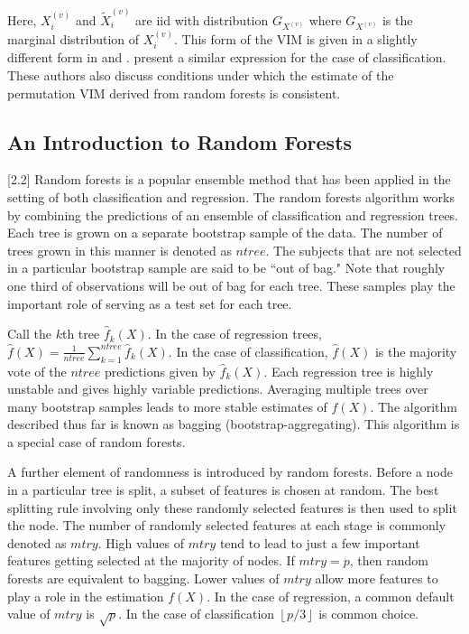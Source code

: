 \documentclass[article,shortnames]{jss}
\begin{document}
Here, $X^{(v)}_{i}$ and $\tilde{X}^{(v)}_{i}$ are iid with distribution $G_{X^{(v)}}$ where $G_{X^{(v)}}$ is the marginal distribution of $X^{(v)}_{i}$.  This form of the VIM is given in a slightly different form in \cite{gregorutti2013correlation} and \cite{zhu2012reinforcement}.
\cite{gregorutti2013correlation} present a similar expression for the case of classification.  
These authors also discuss conditions under which the estimate of the permutation VIM derived from random forests is consistent. 

         
\subsection{An Introduction to Random Forests}[2.2]
Random forests is a popular ensemble method that has been applied in the setting of both classification and regression.  The random forests algorithm works
by combining the predictions of an ensemble of classification and regression trees.  Each tree is grown on a separate bootstrap sample of the data.  The number
of trees grown in this manner is denoted as $ntree$.  The subjects that are not selected in a particular bootstrap sample are said to be ``out of bag."  
Note that roughly one third of observations will be out of bag for each tree.  These samples play the important role of serving as a test set for
each tree.

Call the $k$th tree $\hat{f}_{k}(X)$.  In the case of regression trees,
$\hat{f}(X)=\frac{1}{ntree}\sum_{k=1}^{ntree}\hat{f}_{k}(X)$.  In the case of classification, $\hat{f}(X)$ is the majority vote of the $ntree$ predictions given
by $\hat{f}_{k}(X)$.  Each regression tree is highly unstable and gives highly variable predictions.  Averaging multiple trees over
many bootstrap samples leads to more stable estimates of $f(X)$.  The algorithm described thus far is known as bagging (bootstrap-aggregating).  This 
algorithm is a special case of random forests.  

A further element of randomness is introduced by random forests.  Before a node in a particular tree is split, a subset of features is chosen at random.  
The best splitting rule involving only these randomly selected features is then used to split the node.  The number of randomly selected features at each stage is
commonly denoted as $mtry$.  High values of $mtry$ tend to lead to just a few important features getting selected at the majority of nodes.
If $mtry=p$, then random forests are equivalent to bagging.
Lower values of $mtry$ allow more features to play a role in the estimation $f(X)$.  In the case of regression, a common default value of $mtry$ is $\sqrt{p}$.
In the case of classification  $\left\lfloor p/3 \right\rfloor$ is common choice.  
  
\end{document}
